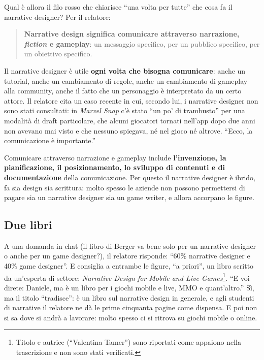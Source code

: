 Qual è allora il filo rosso che chiarisce ``una volta per tutte'' che cosa fa
il narrative designer? Per il relatore:
\begin{quote}
\textbf{Narrative design significa comunicare attraverso narrazione,
\emph{fiction} e gameplay}: un messaggio specifico, per un pubblico
specifico, per un obiettivo specifico.
\end{quote}
Il narrative designer è utile \textbf{ogni volta che bisogna comunicare}:
anche un tutorial, anche un cambiamento di regole, anche un cambiamento di
gameplay alla community, anche il fatto che un personaggio è interpretato da
un certo attore. Il relatore cita un caso recente in cui, secondo lui, i
narrative designer non sono stati consultati: in \emph{Marvel Snap} c'è stato
``un po' di trambusto'' per una modalità di draft particolare, che alcuni
giocatori tornati nell'app dopo due anni non avevano mai visto e che nessuno
spiegava, né nel gioco né altrove. ``Ecco, la comunicazione è importante.''

Comunicare attraverso narrazione e gameplay include \textbf{l'invenzione, la
pianificazione, il posizionamento, lo sviluppo di contenuti e di
documentazione} della comunicazione. Per questo il narrative designer è
ibrido, fa sia design sia scrittura: molto spesso le aziende non possono
permettersi di pagare sia un narrative designer sia un game writer, e allora
accorpano le figure.

\subsection{Due libri}

A una domanda in chat (il libro di Berger va bene solo per un narrative
designer o anche per un game designer?), il relatore risponde: ``60\%
narrative designer e 40\% game designer''. E consiglia a entrambe le figure,
``a priori'', un libro scritto da un'esperta di settore: \emph{Narrative
Design for Mobile and Live Games}\footnote{Titolo e autrice (``Valentina
Tamer'') sono riportati come appaiono nella trascrizione e non sono stati
verificati.}. ``E voi direte: Daniele, ma è un libro per i giochi mobile e
live, MMO e quant'altro.'' Sì, ma il titolo ``tradisce'': è un libro sul
narrative design in generale, e agli studenti di narrative il relatore ne dà
le prime cinquanta pagine come dispensa. E poi non si sa dove si andrà a
lavorare: molto spesso ci si ritrova su giochi mobile o online.

